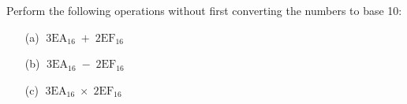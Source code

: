 Perform the following operations without first converting the numbers to base
10:
\begin{enumerate}[nosep]
\item[(a)] $\operatorname{3EA}_{16} + \operatorname{2EF}_{16}$	
\item[(b)] $\operatorname{3EA}_{16} - \operatorname{2EF}_{16}$	
\item[(c)] $\operatorname{3EA}_{16} \times \operatorname{2EF}_{16}$
\end{enumerate}
